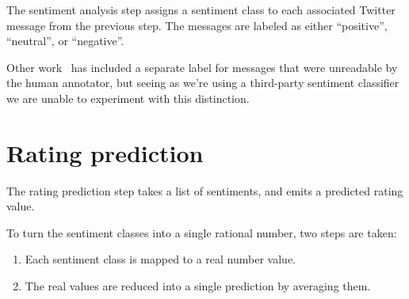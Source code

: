 The sentiment analysis step assigns a sentiment class to each associated Twitter message from the previous step. The messages are labeled as either ``positive'', ``neutral'', or ``negative''.

Other work~\cite{agarwal2011sentiment} has included a separate label for messages that were unreadable by the human annotator, but seeing as we're using a third-party sentiment classifier we are unable to experiment with this distinction.


\section{Rating prediction} %
\label{sec:rating_prediction_step}

The rating prediction step takes a list of sentiments, and emits a predicted rating value.

To turn the sentiment classes into a single rational number, two steps are taken:

\begin{enumerate}
  \item Each sentiment class is mapped to a real number value.
  \item The real values are reduced into a single prediction by averaging them.
\end{enumerate}


